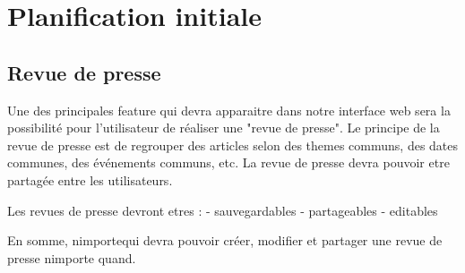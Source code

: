 \section{Planification initiale}
\label{sec:planif}

	\subsection{Revue de presse}
	\label{subsec:revue}
	
	Une des principales feature qui devra apparaitre dans notre interface web sera 
	la possibilité pour l'utilisateur de réaliser une "revue de presse". Le principe
	de la revue de presse est de regrouper des articles selon 
	des themes communs, des dates communes, des événements communs, etc. La revue de
	presse devra pouvoir etre partagée entre les utilisateurs.
	
	Les revues de presse devront etres : 
	- sauvegardables
	- partageables
	- editables
	
	En somme, nimportequi devra pouvoir créer, modifier et partager une revue de 
	presse nimporte quand.